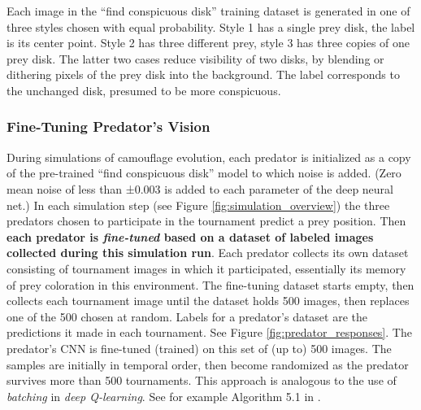 \documentclass[letterpaper]{article}
\newcommand{\jargon}[1]{\textit{#1}}
\newcommand{\runID}{\footnotesize}
\newcommand{\igfour}[1]{\texttt{[image: \#1]}}
\begin{document}
Each image in the ``find conspicuous disk'' training dataset is generated in one of three styles chosen with equal probability. Style 1 has a single prey disk, the label is its center point. Style 2 has three different prey, style 3 has three copies of one prey disk. The latter two cases reduce visibility of two disks, by blending or dithering pixels of the prey disk into the background. The label corresponds to the unchanged disk, presumed to be more conspicuous.
\par

\subsubsection{Fine-Tuning Predator's Vision}
During simulations of camouflage evolution, each predator is initialized as a copy of the pre-trained ``find conspicuous disk'' model to which noise is added. (Zero mean noise of less than ±0.003 is added to each parameter of the deep neural net.) In each simulation step (see Figure \ref{fig:simulation_overview}) the three predators chosen to participate in the tournament predict a prey position. Then \textbf{each predator is \jargon{fine-tuned} based on a dataset of labeled images collected during this simulation run}. 
Each predator collects its own dataset consisting of tournament images in which it participated, essentially its memory of prey coloration in this environment. The fine-tuning dataset starts empty, then collects each tournament image until the dataset holds 500 images, then replaces one of the 500 chosen at random. Labels for a predator's dataset are the predictions it made in each tournament. See Figure \ref{fig:predator_responses}. The predator's CNN is fine-tuned (trained) on this set of (up to) 500 images. The samples are initially in temporal order, then become randomized as the predator survives more than 500 tournaments. This approach is analogous to the use of \jargon{batching} in \jargon{deep Q-learning}. See for example Algorithm 5.1 in \citet{casgrain_deep_2022}.
\par


\end{document}
